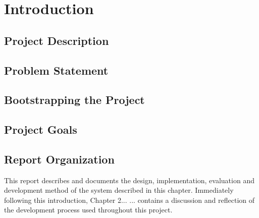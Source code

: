 \chapter{Introduction}

\section{Project Description}
\dummy
{}

\section{Problem Statement}
\dummy

\section{Bootstrapping the Project}
\dummy

\section{Project Goals}
\dummy
{}

\section{Report Organization}
This report describes and documents the design, implementation, evaluation and development method of the system described in this chapter. Immediately following this introduction, Chapter 2... \dummy ...  contains a discussion and reflection of the development process used throughout this project.